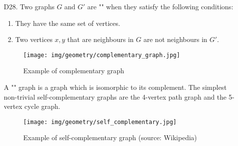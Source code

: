 {\begin{enumerate}
\begin{dem}
\begin{enumerate}
\begin{itemize}
			\item Consider the partial graph $H$ consisting of the edges outside the cycle $\phi$. The vertices of $H$ are also of even degree, the cycle containing an even number of edges incident to each vertex. By induction each connex component $H_i$ of $H$ is an Eulerian graph, and so has an Eulerian cycle $\phi_i$. To rebuild an Euler cycle on $G$, we only need to merge the cycle $\phi$ the with different cycles $\phi$. For this, we travel the cycle $\phi$ from an arbitrary vertices; when we meet for the first time a vertices $x$ from $H_i$, we substitute it the cycle $\phi_i$. The resulting cycle is an Euler cycle in $G$, the cycle $\phi$ and the cycles $\phi_i$ form a partition of the edges.
			\begin{figure}[H]
				\centering
				\texttt{[image: img/geometry/parties\_eulerian\_graph.jpg]}
			\end{figure}
		\end{itemize}
	\end{enumerate}
	\begin{flushright}
		$\blacksquare$  Q.E.D.
	\end{flushright}
	\end{dem}
	\begin{tcolorbox}[title=Remark,colframe=black,arc=10pt]
	This principle of decomposing a graph into connex graphs and summing them permits to build a recursive algorithm for determining if a graph is Eulerian or not.
	\end{tcolorbox}
	
	\item[D28.] Two graphs $G$ and $G'$ are "" when they satisfy the following conditions:
	\begin{enumerate}
		\item They have the same set of vertices.
	
		\item Two vertices $x, y$ that are neighbours in $G$ are not neighbours in $G'$.
	\end{enumerate}
	\begin{figure}[H]
		\centering
		\texttt{[image: img/geometry/complementary\_graph.jpg]}
		\caption{Example of complementary graph}
	\end{figure}
	A "" graph is a graph which is isomorphic to its complement. The simplest non-trivial self-complementary graphs are the 4-vertex path graph and the 5-vertex cycle graph.
	\begin{figure}[H]
		\centering
		\texttt{[image: img/geometry/self\_complementary.jpg]}
		\caption[Example of self-complementary graph]{Example of self-complementary graph (source: Wikipedia)}
	\end{figure}
	

\end{enumerate}}
